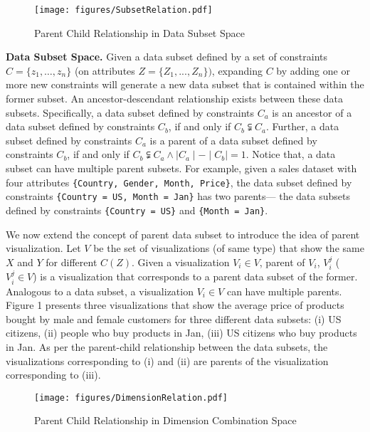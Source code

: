 \begin{figure}[bht]
\label{example}
\centering
\texttt{[image: figures/SubsetRelation.pdf]}
\caption{Parent Child Relationship in Data Subset Space}
\end{figure}

\textbf{Data Subset Space.} Given a data subset defined by a set of constraints $C = \{z_1, \ldots, z_n\}$ (on attributes $Z = \{Z_1, ..., Z_n\})$, expanding $C$ by adding one or more new constraints will generate a new data subset that is contained within the former subset. An ancestor-descendant relationship exists between these data subsets. Specifically, a data subset defined by constraints $C_a$ is an ancestor of a data subset defined by constraints $C_b$, if and only if $C_b \subsetneqq C_a$. Further, a data subset defined by constraints $C_a$ is a parent of a data subset defined by constraints $C_b$, if and only if $C_b \subsetneqq C_a \land \mid C_a \mid - \mid C_b \mid = 1$. Notice that, a data subset can have multiple parent subsets. For example, given a sales dataset with four attributes {\tt\{Country, Gender, Month, Price\}}, the data subset defined by constraints {\tt\{Country = US, Month = Jan\}} has two parents--- the data subsets defined by constraints {\tt\{Country = US\}} and {\tt\{Month = Jan\}}. 

We now extend the concept of parent data subset to introduce the idea of parent visualization. Let $V$ be the set of visualizations (of same type) that show the same $X$ and $Y$ for different $C(Z)$. Given a visualization $V_i \in V$, parent of $V_i$, $V_i^j$ ($V_i^j\in V$) is a visualization that corresponds to a parent data subset of the former. Analogous to a data subset, a visualization $V_i \in V$ can have multiple parents. Figure 1 presents three visualizations that show the average price of products bought by male and female customers for three different data subsets: (i) US citizens, (ii) people who buy products in Jan, (iii) US citizens who buy products in Jan. As per the parent-child relationship between the data subsets, the visualizations corresponding to (i) and (ii) are parents of the visualization corresponding to (iii).

\begin{figure}[bht]
\label{example}
\centering
\texttt{[image: figures/DimensionRelation.pdf]}
\caption{Parent Child Relationship in Dimension Combination Space}
\end{figure}

